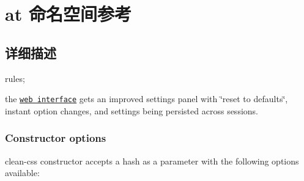 \hypertarget{namespaceat}{}\section{at 命名空间参考}
\label{namespaceat}


\subsection{详细描述}
rules;
\begin{DoxyItemize}
\item the \href{https://jakubpawlowicz.github.io/clean-css}{\tt web interface} gets an improved settings panel with \char`\"{}reset to defaults\char`\"{}, instant option changes, and settings being persisted across sessions.
\end{DoxyItemize}

\subsubsection*{Constructor options}

clean-\/css constructor accepts a hash as a parameter with the following options available\+:


